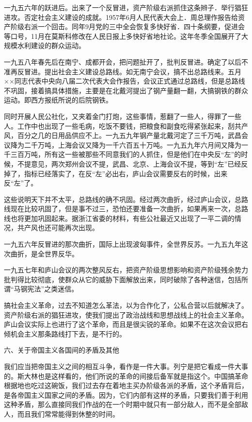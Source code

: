 一九五六年的跃进后。出来了一个反冒进，资产阶级右派抓住这条辫子．举行猖狂进攻。否定社会主义建设的成就。1957年6月人民代表大会上．周总理作报告给资产阶级右派一个回击。同年9月党的三中全会恢复多快好省．四十条纲要，促进会等口号，11月在莫斯科修改在人民日报上多快好省地社论。这年冬季全国展开了大规模水利建设的群众运动。

一九五八年春先后在南宁、成都开会，把问题扯开了，批判反冒进。确定了以后不准再反冒进。提出社会主义建设总路线。如无南宁会议，搞不出总路线来。五月××同志代表中央向八届二次代表大会作报告，会议正式通过总路线，但是总路线不巩固，接着搞具体措施，主要是在北戴河提出了钢产量翻一翻，大搞钢铁的群众运动。即西方报纸所说的后院钢铁。

同时开展人民公社化，又夹着金门打炮，这些事情，惹翻了一些人，得罪了一些人。工作中也出现了一些毛病，吃饭不要钱，把粮食和副食吃得紧张起来，刮共产风，百分之几的日用品供应不上。一九五九年钢产量北戴河定了三千万吨，武昌会议降为二千万吨，上海会议又降为一千六百五十万吨。一九五九年六月间又降为一千三百万吨，所有这一些被那些不同意我们的人抓住，但是他们在中央反“左”的时候，不提意见，两次郑州会议不提，武昌、北京、上海会议不提，等到“左”已经反掉了，指标已经落实了，在反“左”必出右，庐山会议需要反右的时候，出来反“左”了。

这些说明天下并不太平，总路线的确不巩固。经过两次曲折，经过庐山会议，总路线现在比较巩固了，但是事不过三，恐怕还要准备一次曲折，如果再来一次，总路线也将更加巩固起来。据浙江省委的材料，有些公社最近又出现了一平二调的情况，共产风也还可能再次出现。

一九五六年反冒进的那次曲折，国际上出现波匈事件，全世界反苏。一九五九年这次曲折，是全世界反华。

一九五七年和庐山会议的两次整风反右，把资产阶级思想影响和资产阶级残余势力批判得比较彻底，使群众从它的威胁下面解放出来，同时破除了各种迷信，包括所谓“马钢宪法”之类迷信。

搞社会主义革命，过去不知道怎么革法，以为合作化了，公私合营以后就解决了。资产阶级右派的猖狂进攻，使我们提出了政治战线和思想战线上的社会主义革命。庐山会议实际上也进行了这个革命，而且是很尖锐的革命。如果不在这次会议把右倾机会主义那条路线打下去，是不行的。

六、关于帝国主义各国间的矛盾及其他

我们应当把帝国主义之间的相互斗争，看作是一件大事。列宁是把它看成一件大事的。斯大林也是这样看的，他们所说的革命的间接后备军就是指这个。中国搞革命根据地也吃过这碗饭，我们过去存在着地主买办阶级各派的矛盾，这个矛盾背后，是各帝国主义国家之间的矛盾。因为，它们内部有这样的矛盾，只要我们善于利用这种矛盾，那么直接同我们作战的在一个时期中就只有一部分敌人，而不是全部敌人，而且我们常常能得到休整的时间。

